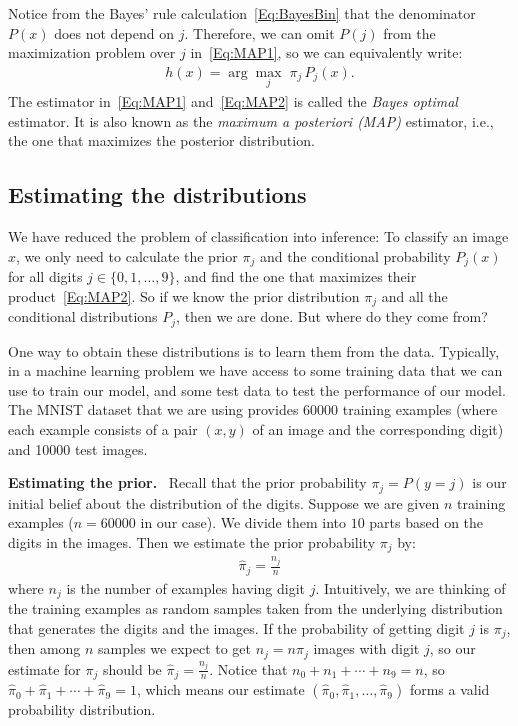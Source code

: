 \documentclass[11pt]{article}
\begin{document}
Notice from the Bayes' rule calculation~\eqref{Eq:BayesBin} that the denominator $P(x)$ does not depend on $j$. Therefore, we can omit $P(j)$ from the maximization problem over $j$ in~\eqref{Eq:MAP1}, so we can equivalently write:
\begin{align}\label{Eq:MAP2}
h(x) = \arg\max_j \; \pi_j \, P_j(x).
\end{align}
The estimator in~\eqref{Eq:MAP1} and~\eqref{Eq:MAP2} is called the {\em Bayes optimal} estimator. It is also known as the {\em maximum a posteriori (MAP)} estimator, i.e., the one that maximizes the posterior distribution.



\subsection*{Estimating the distributions}

We have reduced the problem of classification into inference: To classify an image $x$, we only need to calculate the prior $\pi_j$ and the conditional probability $P_j(x)$ for all digits $j \in \{0,1,\dots,9\}$, and find the one that maximizes their product~\eqref{Eq:MAP2}. So if we know the prior distribution $\pi_j$ and all the conditional distributions $P_j$, then we are done. But where do they come from?

One way to obtain these distributions is to learn them from the data. Typically, in a machine learning problem we have access to some training data that we can use to train our model, and some test data to test the performance of our model. The MNIST dataset that we are using provides 60000 training examples (where each example consists of a pair $(x,y)$ of an image and the corresponding digit) and 10000 test images.

\medskip
{\bf Estimating the prior.}~
Recall that the prior probability $\pi_j = P(y = j)$ is our initial belief about the distribution of the digits. Suppose we are given $n$ training examples ($n = 60000$ in our case). We divide them into $10$ parts based on the digits in the images. Then we estimate the prior probability $\pi_j$ by:
\begin{align}\label{Eq:PriorEst}
\hat \pi_j = \frac{n_j}{n}
\end{align}
where $n_j$ is the number of examples having digit $j$. Intuitively, we are thinking of the training examples as random samples taken from the underlying distribution that generates the digits and the images. If the probability of getting digit $j$ is $\pi_j$, then among $n$ samples we expect to get $n_j = n \pi_j$ images with digit $j$, so our estimate for $\pi_j$ should be $\hat \pi_j = \frac{n_j}{n}$. Notice that $n_0 + n_1 + \cdots + n_9 = n$, so $\hat \pi_0 + \hat \pi_1 + \cdots + \hat \pi_9 = 1$, which means our estimate $(\hat \pi_0, \hat \pi_1, \dots, \hat \pi_9)$ forms a valid probability distribution.
\end{document}

